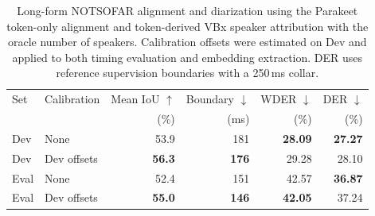 \begin{table}[t]
  \centering
  \caption{Long-form NOTSOFAR alignment and diarization using the Parakeet
  token-only alignment and token-derived VBx speaker attribution with the
  oracle number of speakers. Calibration offsets were estimated on Dev and
  applied to both timing evaluation and embedding extraction. DER uses
  reference supervision boundaries with a 250\,ms collar.}
  \label{tab:notsofar_parakeet_vbx_calibration}
  \begin{tabular}{llrrrr}
  \toprule
  Set & Calibration
      & Mean IoU $\uparrow$
      & Boundary $\downarrow$
      & WDER $\downarrow$
      & DER $\downarrow$ \\
      & & (\%) & (ms) & (\%) & (\%) \\
  \midrule
  Dev  & None        & 53.9 & 181 & \textbf{28.09} & \textbf{27.27} \\
  Dev  & Dev offsets & \textbf{56.3} & \textbf{176} & 29.28 & 28.10 \\
  \midrule
  Eval & None        & 52.4 & 151 & 42.57 & \textbf{36.87} \\
  Eval & Dev offsets & \textbf{55.0} & \textbf{146} & \textbf{42.05} & 37.24 \\
  \bottomrule
  \end{tabular}
  \end{table}